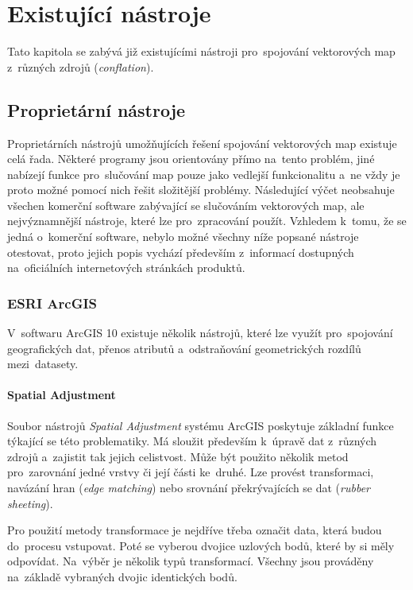 \chapter{Existující nástroje}
\label{3-nastroje}

Tato kapitola se zabývá již existujícími nástroji pro~spojování vektorových map
 z~různých zdrojů (\textit{conflation}).

\section{Proprietární nástroje}
\label{proprietární}

Proprietárních nástrojů umožňujících řešení spojování vektorových map 
existuje celá řada. Některé programy jsou orientovány přímo na~tento problém,
jiné nabízejí funkce pro~slučování map pouze jako vedlejší funkcionalitu 
a~ne vždy je proto možné pomocí nich řešit složitější problémy. Následující
výčet neobsahuje všechen komerční software zabývající se slučováním
vektorových map, ale nejvýznamnější nástroje, které lze pro~zpracování 
použít. Vzhledem k~tomu, že se jedná o~komerční software, nebylo možné 
všechny níže popsané nástroje otestovat, proto jejich popis vychází 
především z~informací dostupných na~oficiálních internetových stránkách 
produktů.


\subsection{ESRI ArcGIS}
\label{arcgis}

V~softwaru ArcGIS 10 existuje několik nástrojů, které lze využít pro~spojování
geo\-grafických dat, přenos atributů a~odstraňování geometrických rozdílů 
mezi~datasety. 

\subsubsection{Spatial Adjustment}

Soubor nástrojů \textit{Spatial Adjustment} systému ArcGIS poskytuje 
základní funkce týkající se této problematiky. Má sloužit především 
k~úpravě dat z~různých zdrojů a~zajistit tak jejich celistvost. Může 
být použito několik metod pro~zarovnání jedné vrstvy či její části 
ke~druhé. Lze provést transformaci, navázání hran (\textit{edge matching})
nebo srovnání překrývajících se dat (\textit{rubber sheeting}).

Pro použití metody transformace je nejdříve třeba označit data, která budou
do~procesu vstupovat. Poté se vyberou dvojice uzlových bodů, které by si měly
odpovídat. Na~výběr je několik typů transformací. Všechny jsou prováděny 
na~základě vybraných dvojic identických bodů. 

